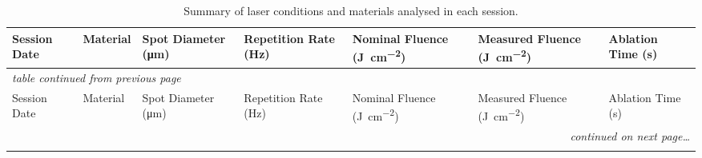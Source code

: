 %

\begin{longtable}{p{} p{} p{} p{} p{} p{} p{}}
  \caption{Summary of laser conditions and materials analysed in each session.}
  \label{TBL:zircon}\\
  \toprule
  Session Date  & Material  & Spot Diameter (\unit{\micro\metre}) &  Repetition Rate (\unit{\hertz})  & Nominal Fluence (\unit{\joule\per\centi\metre\squared})  & Measured Fluence (\unit{\joule\per\centi\metre\squared})  & Ablation Time (\unit{\second}) \\
  \midrule
  \endfirsthead

  \multicolumn{7}{l}{\textit{table continued from previous page}}\\
  \midrule[0.1pt]
  Session Date  & Material  & Spot Diameter (\unit{\micro\metre}) &  Repetition Rate (\unit{\hertz}) & Nominal Fluence (\unit{\joule\per\centi\metre\squared})  & Measured Fluence (\unit{\joule\per\centi\metre\squared})  & Ablation Time (\unit{\second}) \\
  \midrule
  \endhead

  \multicolumn{7}{r}{\textit{continued on next page\dots}}\\
  \endfoot

  \bottomrule
  \endlastfoot


\end{longtable}

